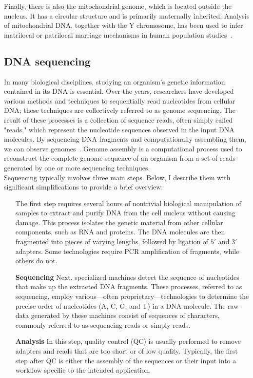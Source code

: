 Finally, there is also the mitochondrial genome, which is located outside the nucleus. It has a circular structure and is primarily maternally inherited. Analysis of mitochondrial DNA, together with the Y chromosome, has been used to infer matrilocal or patrilocal marriage mechanisms in human population studies~\cite{matrilocal}.

\subsection{DNA sequencing}
In many biological disciplines, studying an organism's genetic information contained in its DNA is essential. Over the years, researchers have developed various methods and techniques to sequentially read nucleotides from cellular DNA; these techniques are collectively referred to as genome sequencing. The result of these processes is a collection of sequence reads, often simply called "reads," which represent the nucleotide sequences observed in the input DNA molecules. By sequencing DNA fragments and computationally assembling them, we can observe genomes~\cite{garrison_pangenome}. Genome assembly is a computational process used to reconstruct the complete genome sequence of an organism from a set of reads generated by one or more sequencing techniques.\\
Sequencing typically involves three main steps. Below, I describe them with significant simplifications to provide a brief overview:
\begin{itemize}[leftmargin=1.8cm]
	 \item[\smash{\stackunder{\textbf{Library}}{\textbf{preparation}}}] The first step requires several hours of nontrivial biological manipulation of samples to extract and purify DNA from the cell nucleus without causing damage. This process isolates the genetic material from other cellular components, such as RNA and proteins. The DNA molecules are then fragmented into pieces of varying lengths, followed by ligation of $5\prime$ and $3\prime$ adapters. Some technologies require \gls{PCR} amplification of fragments, while others do not.
	\item[\textbf{Sequencing}]Next, specialized machines detect the sequence of nucleotides that make up the extracted DNA fragments. These processes, referred to as sequencing, employ various—often proprietary—technologies to determine the precise order of nucleotides (A, C, G, and T) in a DNA molecule. The raw data generated by these machines consist of sequences of characters, commonly referred to as sequencing reads or simply reads.
	\item[\textbf{Analysis}] In this step, quality control (\gls{QC}) is usually performed to remove adapters and reads that are too short or of low quality. Typically, the first step after QC is either the assembly of the sequences or their input into a workflow specific to the intended application.
\end{itemize}
